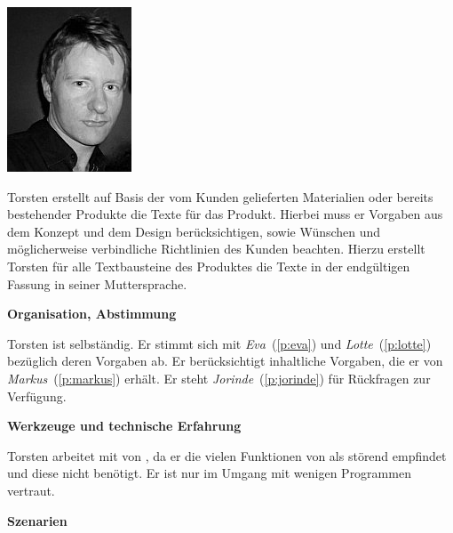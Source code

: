 \begin{multicols}{2}

\begin{center}
\includegraphics[width=0.5\columnwidth]{media/torsten.jpg}
\end{center}


Torsten erstellt auf Basis der vom Kunden gelieferten Materialien oder bereits bestehender Produkte die Texte für das Produkt. Hierbei muss er Vorgaben aus dem Konzept und dem Design berücksichtigen, sowie Wünschen und möglicherweise verbindliche Richtlinien des Kunden beachten. Hierzu erstellt Torsten für alle Textbausteine des Produktes die Texte in der endgültigen Fassung in seiner Muttersprache.

\textbf{Organisation, Abstimmung}

Torsten ist selbständig. Er stimmt sich mit \emph{Eva}~(\ref{p:eva}) und \emph{Lotte}~(\ref{p:lotte}) bezüglich deren Vorgaben ab. Er berücksichtigt inhaltliche Vorgaben, die er von \emph{Markus}~(\ref{p:markus}) erhält. Er steht  \emph{Jorinde}~(\ref{p:jorinde}) für Rückfragen zur Verfügung.

\textbf{Werkzeuge und technische Erfahrung}

Torsten arbeitet mit  von , da er die vielen Funktionen von  als störend empfindet und diese nicht benötigt. Er ist nur im Umgang mit wenigen Programmen vertraut.

\columnbreak

\textbf{Szenarien}


\end{multicols}
